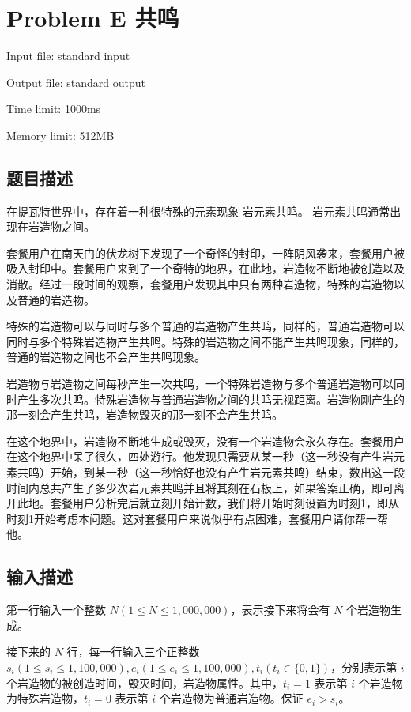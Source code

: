 \newpage
\section{Problem E 共鸣}
{ \limitfont{}
Input file: standard input \par
Output file: standard output \par
Time limit: 1000ms \par
Memory limit: 512MB \par
}
\subsection*{题目描述}

在提瓦特世界中，存在着一种很特殊的元素现象-岩元素共鸣。
岩元素共鸣通常出现在岩造物之间。

套餐用户在南天门的伏龙树下发现了一个奇怪的封印，一阵阴风袭来，套餐用户被吸入封印中。套餐用户来到了一个奇特的地界，在此地，岩造物不断地被创造以及消散。经过一段时间的观察，套餐用户发现其中只有两种岩造物，特殊的岩造物以及普通的岩造物。

特殊的岩造物可以与同时与多个普通的岩造物产生共鸣，同样的，普通岩造物可以同时与多个特殊岩造物产生共鸣。特殊的岩造物之间不能产生共鸣现象，同样的，普通的岩造物之间也不会产生共鸣现象。

岩造物与岩造物之间每秒产生一次共鸣，一个特殊岩造物与多个普通岩造物可以同时产生多次共鸣。特殊岩造物与普通岩造物之间的共鸣无视距离。岩造物刚产生的那一刻会产生共鸣，岩造物毁灭的那一刻不会产生共鸣。

在这个地界中，岩造物不断地生成或毁灭，没有一个岩造物会永久存在。套餐用户在这个地界中呆了很久，四处游行。他发现只需要从某一秒（这一秒没有产生岩元素共鸣）开始，到某一秒（这一秒恰好也没有产生岩元素共鸣）结束，数出这一段时间内总共产生了多少次岩元素共鸣并且将其刻在石板上，如果答案正确，即可离开此地。套餐用户分析完后就立刻开始计数，我们将开始时刻设置为时刻1，即从时刻1开始考虑本问题。这对套餐用户来说似乎有点困难，套餐用户请你帮一帮他。

\subsection*{输入描述}

第一行输入一个整数 $N(1 \le N \le 1,000,000)$，表示接下来将会有 $N$ 个岩造物生成。

接下来的 $N$ 行，每一行输入三个正整数 $s_i(1 \le s_i \le 1,100,000),e_i(1 \le e_i \le 1,100,000),t_i(t_i \in \{0,1\})$，分别表示第 $i$ 个岩造物的被创造时间，毁灭时间，岩造物属性。其中，$t_i=1$ 表示第 $i$ 个岩造物为特殊岩造物，$t_i=0$ 表示第 $i$ 个岩造物为普通岩造物。保证 $e_i > s_i$。

